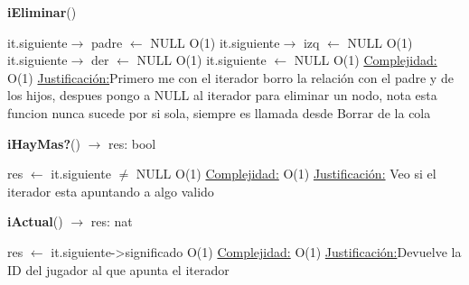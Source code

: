 \begin{Representacion}
\begin{Algoritmos}
\begin{algorithm}[H]{\textbf{iEliminar}()}
	\begin{algorithmic}[1]
		\State it.siguiente$\to$ padre $\gets$ NULL \Comment O(1)		
		\State it.siguiente$\to$ izq $\gets$ NULL \Comment O(1)		
		\State it.siguiente$\to$ der $\gets$ NULL \Comment O(1)		
		\State it.siguiente $\gets$ NULL \Comment O(1)		
		\medskip
		\Statex \underline{Complejidad:} O(1)
			\Statex \underline{Justificación:}Primero me con el iterador borro la relación con el padre y de los hijos, despues pongo a NULL al iterador para eliminar un nodo, nota esta funcion nunca sucede por si sola, siempre es llamada desde Borrar de la cola
	\end{algorithmic}
\end{algorithm}

\begin{algorithm}[H]{\textbf{iHayMas?}() $\to$ res: bool}
	\begin{algorithmic}[1]
		\State res $\gets$ it.siguiente $\neq$ NULL \Comment O(1)
		\medskip
		\Statex \underline{Complejidad:} O(1)
			\Statex \underline{Justificación:} Veo si el iterador esta apuntando a algo valido
	\end{algorithmic}
\end{algorithm}

\begin{algorithm}[H]{\textbf{iActual}() $\to$ res: nat}
	\begin{algorithmic}[1]
		\State res $\gets$ it.siguiente->significado \Comment O(1)		
		\medskip
		\Statex \underline{Complejidad:} O(1)
			\Statex \underline{Justificación:}Devuelve la ID del jugador al que apunta el iterador
	\end{algorithmic}
\end{algorithm}


\end{Algoritmos}

\end{Representacion}
